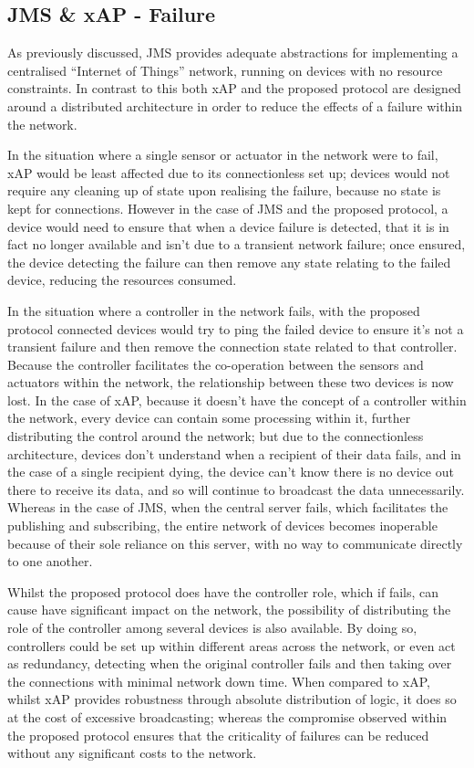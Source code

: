 \subsection{JMS \& xAP - Failure} %
\label{sub:jms_failure}
As previously discussed, JMS provides adequate abstractions for implementing a centralised ``Internet of Things'' network, running on devices with no resource constraints. In contrast to this both xAP and the proposed protocol are designed around a distributed architecture in order to reduce the effects of a failure within the network.

In the situation where a single sensor or actuator in the network were to fail, xAP would be least affected due to its connectionless set up; devices would not require any cleaning up of state upon realising the failure, because no state is kept for connections. However in the case of JMS and the proposed protocol, a device would need to ensure that when a device failure is detected, that it is in fact no longer available and isn't due to a transient network failure; once ensured, the device detecting the failure can then remove any state relating to the failed device, reducing the resources consumed.

In the situation where a controller in the network fails, with the proposed protocol connected devices would try to ping the failed device to ensure it's not a transient failure and then remove the connection state related to that controller. Because the controller facilitates the co-operation between the sensors and actuators within the network, the relationship between these two devices is now lost. In the case of xAP, because it doesn't have the concept of a controller within the network, every device can contain some processing within it, further distributing the control around the network; but due to the connectionless architecture, devices don't understand when a recipient of their data fails, and in the case of a single recipient dying, the device can't know there is no device out there to receive its data, and so will continue to broadcast the data unnecessarily. Whereas in the case of JMS, when the central server fails, which facilitates the publishing and subscribing, the entire network of devices becomes inoperable because of their sole reliance on this server, with no way to communicate directly to one another.

Whilst the proposed protocol does have the controller role, which if fails, can cause have significant impact on the network, the possibility of distributing the role of the controller among several devices is also available. By doing so, controllers could be set up within different areas across the network, or even act as redundancy, detecting when the original controller fails and then taking over the connections with minimal network down time. When compared to xAP, whilst xAP provides robustness through absolute distribution of logic, it does so at the cost of excessive broadcasting; whereas the compromise observed within the proposed protocol ensures that the criticality of failures can be reduced without any significant costs to the network. 




